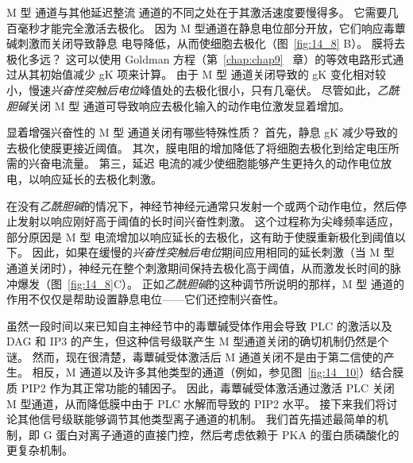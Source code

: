 M 型  通道与其他延迟整流  通道的不同之处在于其激活速度要慢得多。
它需要几百毫秒才能完全激活去极化。
因为 M 型通道在静息电位部分开放，它们响应毒蕈碱刺激而关闭导致静息  电导降低，从而使细胞去极化（图~\ref{fig:14_8} B）。
膜将去极化多远？
这可以使用 Goldman 方程（第~\ref{chap:chap9} ~章）的等效电路形式通过从其初始值减少 gK 项来计算。
由于 M 型  通道关闭导致的 gK 变化相对较小，慢速\textit{兴奋性突触后电位}峰值处的去极化很小，只有几毫伏。
尽管如此，\textit{乙酰胆碱}关闭 M 型  通道可导致响应去极化输入的动作电位激发显着增加。


显着增强兴奋性的 M 型  通道关闭有哪些特殊性质？
首先，静息 gK 减少导致的去极化使膜更接近阈值。
其次，膜电阻的增加降低了将细胞去极化到给定电压所需的兴奋电流量。
第三，延迟  电流的减少使细胞能够产生更持久的动作电位放电，以响应延长的去极化刺激。


在没有\textit{乙酰胆碱}的情况下，神经节神经元通常只发射一个或两个动作电位，然后停止发射以响应刚好高于阈值的长时间兴奋性刺激。
这个过程称为尖峰频率适应，部分原因是 M 型  电流增加以响应延长的去极化，这有助于使膜重新极化到阈值以下。
因此，如果在缓慢的\textit{兴奋性突触后电位}期间应用相同的延长刺激（当 M 型  通道关闭时），神经元在整个刺激期间保持去极化高于阈值，从而激发长时间的脉冲爆发（图~\ref{fig:14_8}C）。
正如\textit{乙酰胆碱}的这种调节所说明的那样，M 型  通道的作用不仅仅是帮助设置静息电位——它们还控制兴奋性。


虽然一段时间以来已知自主神经节中的毒蕈碱受体作用会导致 PLC 的激活以及 DAG 和 IP3 的产生，但这种信号级联产生 M 型通道关闭的确切机制仍然是个谜。
然而，现在很清楚，毒蕈碱受体激活后 M 通道关闭不是由于第二信使的产生。
相反，M 通道以及许多其他类型的通道（例如，参见图~\ref{fig:14_10}）结合膜质 PIP2 作为其正常功能的辅因子。
因此，毒蕈碱受体激活通过激活 PLC 关闭 M 型通道，从而降低膜中由于 PLC 水解而导致的 PIP2 水平。
接下来我们将讨论其他信号级联能够调节其他类型离子通道的机制。
我们首先描述最简单的机制，即 G 蛋白对离子通道的直接门控，然后考虑依赖于 PKA 的蛋白质磷酸化的更复杂机制。


